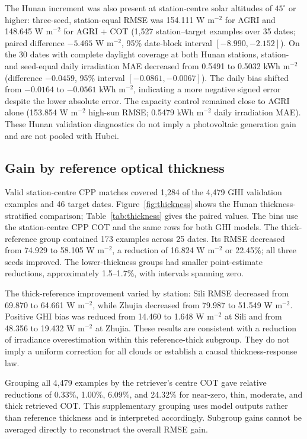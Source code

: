 \documentclass[11pt]{article}
\begin{document}
The Hunan increment was also present at station-centre solar altitudes of $45^\circ$ or higher: three-seed, station-equal RMSE was 154.111 W m$^{-2}$ for AGRI and 148.645 W m$^{-2}$ for AGRI + COT (1,527 station--target examples over 35 dates; paired difference $-5.465$ W m$^{-2}$, 95\% date-block interval $[-8.990,-2.152]$). On the 30 dates with complete daylight coverage at both Hunan stations, station- and seed-equal daily irradiation MAE decreased from 0.5491 to 0.5032 kWh m$^{-2}$ (difference $-0.0459$, 95\% interval $[-0.0861,-0.0067]$). The daily bias shifted from $-0.0164$ to $-0.0561$ kWh m$^{-2}$, indicating a more negative signed error despite the lower absolute error. The capacity control remained close to AGRI alone (153.854 W m$^{-2}$ high-sun RMSE; 0.5479 kWh m$^{-2}$ daily irradiation MAE). These Hunan validation diagnostics do not imply a photovoltaic generation gain and are not pooled with Hubei.
\subsection{Gain by reference optical thickness}
Valid station-centre CPP matches covered 1,284 of the 4,479 GHI validation examples and 46 target dates. Figure~\ref{fig:thickness} shows the Hunan thickness-stratified comparison; Table~\ref{tab:thickness} gives the paired values. The bins use the station-centre CPP COT and the same rows for both GHI models. The thick-reference group contained 173 examples across 25 dates. Its RMSE decreased from 74.929 to 58.105 W m$^{-2}$, a reduction of 16.824 W m$^{-2}$ or 22.45\%; all three seeds improved. The lower-thickness groups had smaller point-estimate reductions, approximately 1.5--1.7\%, with intervals spanning zero.



The thick-reference improvement varied by station: Sili RMSE decreased from 69.870 to 64.661 W m$^{-2}$, while Zhujia decreased from 79.987 to 51.549 W m$^{-2}$. Positive GHI bias was reduced from 14.460 to 1.648 W m$^{-2}$ at Sili and from 48.356 to 19.432 W m$^{-2}$ at Zhujia. These results are consistent with a reduction of irradiance overestimation within this reference-thick subgroup. They do not imply a uniform correction for all clouds or establish a causal thickness-response law.

Grouping all 4,479 examples by the retriever's centre COT gave relative reductions of 0.33\%, 1.00\%, 6.09\%, and 24.32\% for near-zero, thin, moderate, and thick retrieved COT. This supplementary grouping uses model outputs rather than reference thickness and is interpreted accordingly. Subgroup gains cannot be averaged directly to reconstruct the overall RMSE gain.
\end{document}
